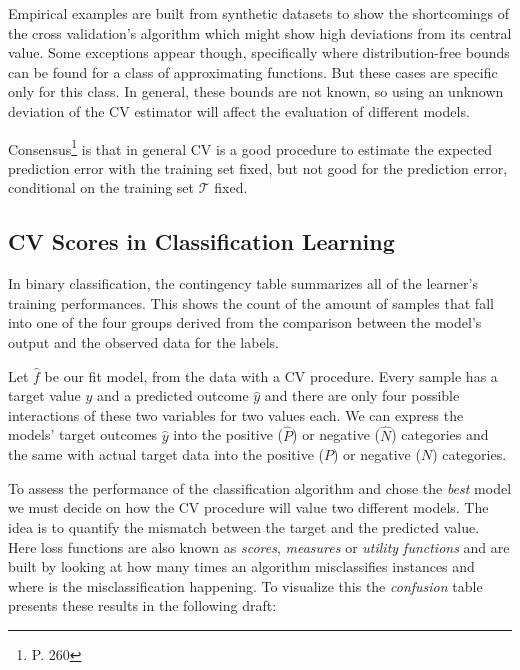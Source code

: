 Empirical examples are built from synthetic datasets to show the shortcomings of the cross validation's algorithm which might show high deviations from its central value. Some exceptions appear though, specifically where distribution-free bounds can be found for a class of approximating functions. But these cases are specific only for this class. In general, these bounds are not known, so using an unknown deviation of the CV estimator will affect the evaluation of different models.

Consensus\footnote{\textcite{hastie-elemstatslearn} P. 260} is that in general CV is a good procedure to estimate the expected prediction error with the training set fixed, but not good for the prediction error, conditional on the training set $\mathcal{T}$ fixed.



\subsection{CV Scores in Classification Learning}\label{section:scoring_functions}

In binary classification, the contingency table summarizes all of the learner's training performances. This shows the count of the amount of samples that fall into one of the four groups derived from the comparison between the model's output and the observed data for the labels.

 Let $\hat{f}$ be our fit model, from the data with a CV procedure. Every sample has a target value $y$ and a predicted outcome $\hat{y}$ and there are only four possible interactions of these two variables for two values each. We can express the models' target outcomes $\hat{y}$ into the positive ($\hat{P}$) or negative ($\hat{N}$) categories and the same with actual target data into the positive ($P$) or negative ($N$) categories.

To assess the performance of the classification algorithm and chose the \textit{best} model we must decide on how the CV procedure will value two different models. The idea is to quantify the mismatch between the target and the predicted value. Here loss functions are also known as \textit{scores}, \textit{measures} or \textit{utility functions} and are built by looking at how many times an algorithm misclassifies instances and where is the misclassification happening. To visualize this the \textit{confusion} table presents these results in the following draft:

